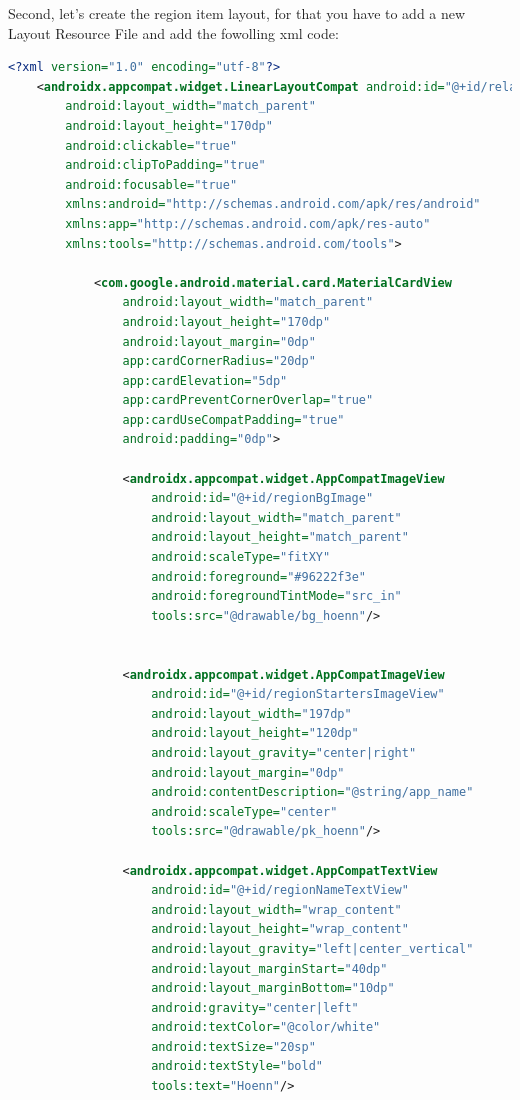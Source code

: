\documentclass[a4paper, 12pt]{article}
\begin{document}
Second, let's create the region item layout, for that you have to add a new Layout Resource File and add the fowolling xml code:

\begin{lstlisting}[caption={Region Item Layout.}, label={code:screen_item_region}, language=XML]
    <?xml version="1.0" encoding="utf-8"?>
    <androidx.appcompat.widget.LinearLayoutCompat android:id="@+id/relativeLayoutBackground"
        android:layout_width="match_parent"
        android:layout_height="170dp"
        android:clickable="true"
        android:clipToPadding="true"
        android:focusable="true"
        xmlns:android="http://schemas.android.com/apk/res/android"
        xmlns:app="http://schemas.android.com/apk/res-auto"
        xmlns:tools="http://schemas.android.com/tools">
    
            <com.google.android.material.card.MaterialCardView
                android:layout_width="match_parent"
                android:layout_height="170dp"
                android:layout_margin="0dp"
                app:cardCornerRadius="20dp"
                app:cardElevation="5dp"
                app:cardPreventCornerOverlap="true"
                app:cardUseCompatPadding="true"
                android:padding="0dp">
    
                <androidx.appcompat.widget.AppCompatImageView
                    android:id="@+id/regionBgImage"
                    android:layout_width="match_parent"
                    android:layout_height="match_parent"
                    android:scaleType="fitXY"
                    android:foreground="#96222f3e"
                    android:foregroundTintMode="src_in"
                    tools:src="@drawable/bg_hoenn"/>
    
    
                <androidx.appcompat.widget.AppCompatImageView
                    android:id="@+id/regionStartersImageView"
                    android:layout_width="197dp"
                    android:layout_height="120dp"
                    android:layout_gravity="center|right"
                    android:layout_margin="0dp"
                    android:contentDescription="@string/app_name"
                    android:scaleType="center"
                    tools:src="@drawable/pk_hoenn"/>
    
                <androidx.appcompat.widget.AppCompatTextView
                    android:id="@+id/regionNameTextView"
                    android:layout_width="wrap_content"
                    android:layout_height="wrap_content"
                    android:layout_gravity="left|center_vertical"
                    android:layout_marginStart="40dp"
                    android:layout_marginBottom="10dp"
                    android:gravity="center|left"
                    android:textColor="@color/white"
                    android:textSize="20sp"
                    android:textStyle="bold"
                    tools:text="Hoenn"/>
    

\end{lstlisting}
\end{document}
